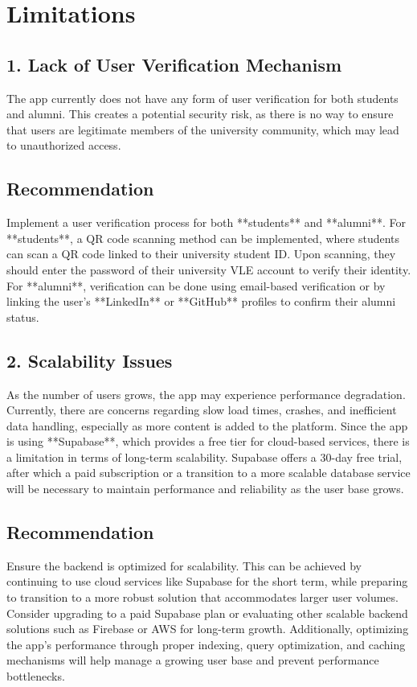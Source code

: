 \documentclass{article}
\begin{document}
\maketitle

\section*{Limitations}

\subsection*{1. Lack of User Verification Mechanism}
The app currently does not have any form of user verification for both students and alumni. This creates a potential security risk, as there is no way to ensure that users are legitimate members of the university community, which may lead to unauthorized access.

\subsection*{Recommendation}
Implement a user verification process for both **students** and **alumni**. For **students**, a QR code scanning method can be implemented, where students can scan a QR code linked to their university student ID. Upon scanning, they should enter the password of their university VLE account to verify their identity. For **alumni**, verification can be done using email-based verification or by linking the user’s **LinkedIn** or **GitHub** profiles to confirm their alumni status.

\subsection*{2. Scalability Issues}
As the number of users grows, the app may experience performance degradation. Currently, there are concerns regarding slow load times, crashes, and inefficient data handling, especially as more content is added to the platform. Since the app is using **Supabase**, which provides a free tier for cloud-based services, there is a limitation in terms of long-term scalability. Supabase offers a 30-day free trial, after which a paid subscription or a transition to a more scalable database service will be necessary to maintain performance and reliability as the user base grows.

\subsection*{Recommendation}
Ensure the backend is optimized for scalability. This can be achieved by continuing to use cloud services like Supabase for the short term, while preparing to transition to a more robust solution that accommodates larger user volumes. Consider upgrading to a paid Supabase plan or evaluating other scalable backend solutions such as Firebase or AWS for long-term growth. Additionally, optimizing the app’s performance through proper indexing, query optimization, and caching mechanisms will help manage a growing user base and prevent performance bottlenecks.
\end{document}
